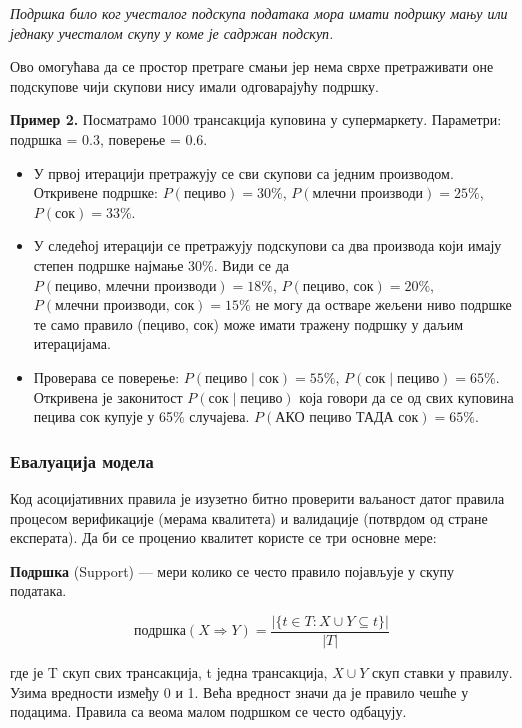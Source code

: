 \textit{Подршка било ког учесталог подскупа података мора имати подршку мању или једнаку учесталом скупу у коме је садржан подскуп.}

Ово омогућава да се простор претраге смањи јер нема сврхе претраживати оне подскупове чији скупови нису имали одговарајућу подршку.

\textbf{Пример 2.} Посматрамо 1000 трансакција куповина у супермаркету. Параметри: подршка = 0.3, поверење = 0.6.

\begin{itemize}
  \item У првој итерацији претражују се сви скупови са једним производом. Откривене подршке: $P(\textrm{пециво}) = 30\%$, $P(\textrm{млечни производи}) = 25\%$, $P(\textrm{сок}) = 33\%$.
  \item У следећој итерацији се претражују подскупови са два производа који имају степен подршке најмање 30\%. Види се да $P(\textrm{пециво, млечни производи}) = 18\%$, $P(\textrm{пециво, сок}) = 20\%$, $P(\textrm{млечни производи, сок}) = 15\%$ не могу да остваре жељени ниво подршке те само правило (пециво, сок) може имати тражену подршку у даљим итерацијама.
  \item Проверава се поверење: $P(\textrm{пециво} \mid \textrm{сок}) = 55\%$, $P(\textrm{сок} \mid \textrm{пециво}) = 65\%$. Откривена је законитост $P(\textrm{сок} \mid \textrm{пециво})$ која говори да се од свих куповина пецива сок купује у 65\% случајева. $P(\textrm{АКО пециво ТАДА сок}) = 65\%$.
\end{itemize}

\subsubsection{Евалуација модела}
Код асоцијативних правила је изузетно битно проверити ваљаност датог правила процесом верификације (мерама квалитета) и валидације (потврдом од стране експерата). Да би се проценио квалитет користе се три основне мере:

\textbf{Подршка} (Support) — мери колико се често правило појављује у скупу података.

\[
\textrm{подршка}(X \Rightarrow Y)=\frac{\vert \{t \in T : X \cup Y \subseteq t\}\vert }{\vert T\vert }
\]

где је T скуп свих трансакција, t једна трансакција, \(X \cup Y\) скуп ставки у правилу. Узима вредности између 0 и 1. Већа вредност значи да је правило чешће у подацима. Правила са веома малом подршком се често одбацују.

